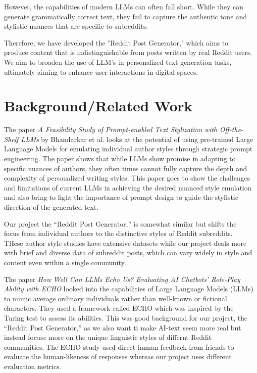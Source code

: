 \documentclass{article}
\begin{document}
However, the capabilities of modern LLMs can often fall short. While they can generate grammatically correct text, they fail to capture the authentic tone and stylistic nuances that are specific to subreddits.

Therefore, we have developed the "Reddit Post Generator," which aims to produce content that is indistinguishable from posts written by real Reddit users. We aim to broaden the use of LLM's in personalized text generation tasks, ultimately aiming to enhance user interactions in digital spaces.

\section{Background/Related Work}
\vspace{10pt}

The paper \textit{A Feasibility Study of Prompt-enabled Text Stylization with Off-the-Shelf LLMs} by Bhandarkar et al. looks at the potential of using pre-trained Large Language Models for emulating individual author styles through strategic prompt engineering. The paper shows that while LLMs show promise in adapting to specific nuances of authors, they often times cannot  fully capture the depth and complexity of personalized writing styles. This paper goes to show the challenges and limitations of current LLMs in achieving the desired nuanced style emulation and also bring to light the  importance of prompt design to guide the stylistic direction of the generated text.

Our project the ``Reddit Post Generator,'' is somewhat similar but shifts the focus from individual authors to the distinctive styles of Reddit subreddits. THese author style studies have extensive datasets while our project deals more with brief and diverse data of subreddit posts, which can vary widely in style and content even within a single community. 
\vspace{10pt}


The paper \textit{How Well Can LLMs Echo Us? Evaluating AI Chatbots' Role-Play Ability with ECHO} looked into the capabilities of Large Language Models (LLMs)  to mimic average ordinary individuals rather than well-known or fictional characters, They used a framework called ECHO which was inspired by the Turing test to assess its abilities. This was good background for our project, the ``Reddit Post Generator,'' as we also want ti make AI-text seem more real  but instead focuse more on  the unique linguistic styles of differnt Reddit communities. The ECHO study used direct human feedback from friends to evaluate the human-likeness of responses whereas our project uses different evaluation metrics. 
\vspace{10pt}
\end{document}
